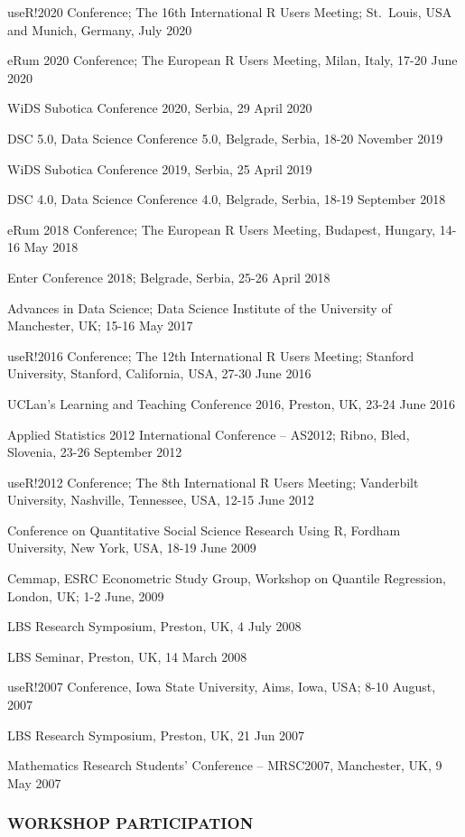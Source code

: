 \documentclass[
]{article}
\begin{document}
useR!2020 Conference; The 16th International R Users Meeting; St.~Louis,
USA and Munich, Germany, July 2020

eRum 2020 Conference; The European R Users Meeting, Milan, Italy, 17-20
June 2020

WiDS Subotica Conference 2020, Serbia, 29 April 2020

DSC 5.0, Data Science Conference 5.0, Belgrade, Serbia, 18-20 November
2019

WiDS Subotica Conference 2019, Serbia, 25 April 2019

DSC 4.0, Data Science Conference 4.0, Belgrade, Serbia, 18-19 September
2018

eRum 2018 Conference; The European R Users Meeting, Budapest, Hungary,
14-16 May 2018

Enter Conference 2018; Belgrade, Serbia, 25-26 April 2018

Advances in Data Science; Data Science Institute of the University of
Manchester, UK; 15-16 May 2017

useR!2016 Conference; The 12th International R Users Meeting; Stanford
University, Stanford, California, USA, 27-30 June 2016

UCLan's Learning and Teaching Conference 2016, Preston, UK, 23-24 June
2016

Applied Statistics 2012 International Conference -- AS2012; Ribno, Bled,
Slovenia, 23-26 September 2012

useR!2012 Conference; The 8th International R Users Meeting; Vanderbilt
University, Nashville, Tennessee, USA, 12-15 June 2012

Conference on Quantitative Social Science Research Using R, Fordham
University, New York, USA, 18-19 June 2009

Cemmap, ESRC Econometric Study Group, Workshop on Quantile Regression,
London, UK; 1-2 June, 2009

LBS Research Symposium, Preston, UK, 4 July 2008

LBS Seminar, Preston, UK, 14 March 2008

useR!2007 Conference, Iowa State University, Aims, Iowa, USA; 8-10
August, 2007

LBS Research Symposium, Preston, UK, 21 Jun 2007

Mathematics Research Students' Conference -- MRSC2007, Manchester, UK, 9
May 2007

\hypertarget{workshop-participation}{%
\subsubsection{WORKSHOP PARTICIPATION}\label{workshop-participation}}
\end{document}
